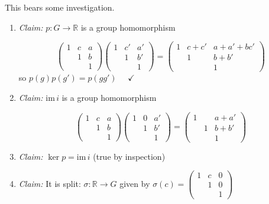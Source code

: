 \documentclass[12pt]{article}
\newcommand{\R}{\mathbb{R}}
\newcommand{\im}{\text{im}\,}
\begin{document}
    This bears some investigation. 
    \begin{enumerate}
        \item \emph{Claim:} $p: G \to \R$ is a group homomorphism 
        
        \[\begin{pmatrix}
            1 & c & a\\ 
            & 1 & b\\ 
            & & 1
        \end{pmatrix} \begin{pmatrix}
            1 & c' & a'\\ 
            & 1 & b'\\ 
            & & 1
        \end{pmatrix} = \begin{pmatrix}
            1 & c + c' & a + a' + bc'\\ 
            & 1 & b + b'\\ 
            & & 1
        \end{pmatrix}\]
        so $p(g) p(g') = p(gg')$ $\quad \checkmark$ 

        \item \emph{Claim:} $\im i$ is a group homomorphism 
        
        \[\begin{pmatrix}
            1 & c & a\\ 
            & 1 & b\\ 
            & & 1
        \end{pmatrix} \begin{pmatrix}
            1 & 0 & a'\\ 
            & 1 & b'\\ 
            & & 1
        \end{pmatrix} = \begin{pmatrix}
            1 &  & a + a'\\ 
            & 1 & b + b'\\ 
            & & 1
        \end{pmatrix}\]

        \item \emph{Claim:} $\ker p  = \im i$ (true by inspection)
        
        \item \emph{Claim:} It is split: $\sigma: \R \to G$ given by $\sigma(c) = \begin{pmatrix}
            1 & c & 0\\ 
            & 1 & 0\\ 
            & & 1
        \end{pmatrix}$
    \end{enumerate}
\end{document}
